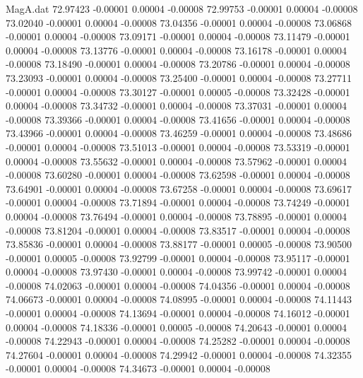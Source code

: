 \begin{filecontents}{MagA.dat}
  72.97423   -0.00001    0.00004   -0.00008
  72.99753   -0.00001    0.00004   -0.00008
  73.02040   -0.00001    0.00004   -0.00008
  73.04356   -0.00001    0.00004   -0.00008
  73.06868   -0.00001    0.00004   -0.00008
  73.09171   -0.00001    0.00004   -0.00008
  73.11479   -0.00001    0.00004   -0.00008
  73.13776   -0.00001    0.00004   -0.00008
  73.16178   -0.00001    0.00004   -0.00008
  73.18490   -0.00001    0.00004   -0.00008
  73.20786   -0.00001    0.00004   -0.00008
  73.23093   -0.00001    0.00004   -0.00008
  73.25400   -0.00001    0.00004   -0.00008
  73.27711   -0.00001    0.00004   -0.00008
  73.30127   -0.00001    0.00005   -0.00008
  73.32428   -0.00001    0.00004   -0.00008
  73.34732   -0.00001    0.00004   -0.00008
  73.37031   -0.00001    0.00004   -0.00008
  73.39366   -0.00001    0.00004   -0.00008
  73.41656   -0.00001    0.00004   -0.00008
  73.43966   -0.00001    0.00004   -0.00008
  73.46259   -0.00001    0.00004   -0.00008
  73.48686   -0.00001    0.00004   -0.00008
  73.51013   -0.00001    0.00004   -0.00008
  73.53319   -0.00001    0.00004   -0.00008
  73.55632   -0.00001    0.00004   -0.00008
  73.57962   -0.00001    0.00004   -0.00008
  73.60280   -0.00001    0.00004   -0.00008
  73.62598   -0.00001    0.00004   -0.00008
  73.64901   -0.00001    0.00004   -0.00008
  73.67258   -0.00001    0.00004   -0.00008
  73.69617   -0.00001    0.00004   -0.00008
  73.71894   -0.00001    0.00004   -0.00008
  73.74249   -0.00001    0.00004   -0.00008
  73.76494   -0.00001    0.00004   -0.00008
  73.78895   -0.00001    0.00004   -0.00008
  73.81204   -0.00001    0.00004   -0.00008
  73.83517   -0.00001    0.00004   -0.00008
  73.85836   -0.00001    0.00004   -0.00008
  73.88177   -0.00001    0.00005   -0.00008
  73.90500   -0.00001    0.00005   -0.00008
  73.92799   -0.00001    0.00004   -0.00008
  73.95117   -0.00001    0.00004   -0.00008
  73.97430   -0.00001    0.00004   -0.00008
  73.99742   -0.00001    0.00004   -0.00008
  74.02063   -0.00001    0.00004   -0.00008
  74.04356   -0.00001    0.00004   -0.00008
  74.06673   -0.00001    0.00004   -0.00008
  74.08995   -0.00001    0.00004   -0.00008
  74.11443   -0.00001    0.00004   -0.00008
  74.13694   -0.00001    0.00004   -0.00008
  74.16012   -0.00001    0.00004   -0.00008
  74.18336   -0.00001    0.00005   -0.00008
  74.20643   -0.00001    0.00004   -0.00008
  74.22943   -0.00001    0.00004   -0.00008
  74.25282   -0.00001    0.00004   -0.00008
  74.27604   -0.00001    0.00004   -0.00008
  74.29942   -0.00001    0.00004   -0.00008
  74.32355   -0.00001    0.00004   -0.00008
  74.34673   -0.00001    0.00004   -0.00008

\end{filecontents}
